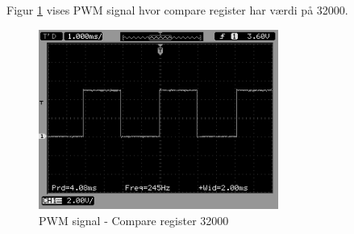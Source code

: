 Figur \ref{fig:PWM_3} vises PWM signal hvor compare register har værdi på 32000. 
\begin{figure}[H]
\centering
\includegraphics[width=0.7\textwidth]{Billeder/Test/PWM_32000.png}
\vspace{-0.0cm}
\caption{PWM signal - Compare register 32000}
\label{fig:PWM_3}
\end{figure}



 






